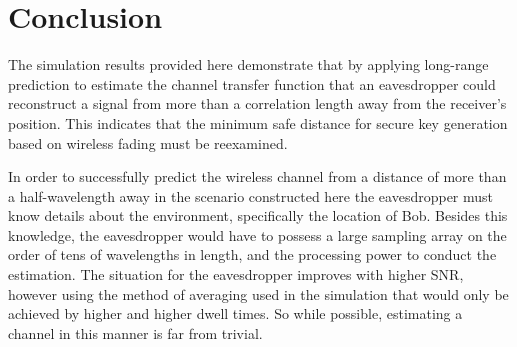 \documentclass{allertonproc}
\begin{document}
\FloatBarrier
\section{Conclusion}

The simulation results provided here demonstrate that by applying long-range prediction to estimate the channel transfer function that an eavesdropper could reconstruct a signal from more than a correlation length away from the receiver's position.  This indicates that the minimum safe distance for secure key generation based on wireless fading must be reexamined.

In order to successfully predict the wireless channel from a distance of more than a half-wavelength away in the scenario constructed here the eavesdropper must know details about the environment, specifically the location of Bob. Besides this knowledge, the eavesdropper would have to possess a large sampling array on the order of tens of wavelengths in length, and the processing power to conduct the estimation. The situation for the eavesdropper improves with higher SNR, however using the method of averaging used in the simulation that would only be achieved by higher and higher dwell times. So while possible, estimating a channel in this manner is far from trivial. %



{}
\end{document}
